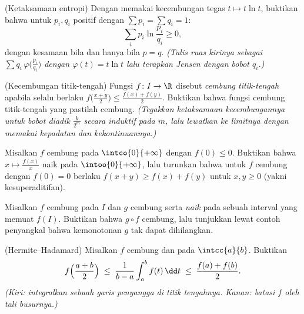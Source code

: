\begin{exercise}[$\star\star$]\label{exo:b2:realfun:7}
(Ketaksamaan entropi) Dengan memakai kecembungan tegas $t \mapsto t\ln
t$, buktikan bahwa untuk $p_i, q_i$ positif dengan $\sum p_i = \sum q_i = 1$:
\[
\sum_i p_i \ln\frac{p_i}{q_i} \geq 0 ,
\]
dengan kesamaan bila dan hanya bila $p = q$. \emph{(Tulis ruas kirinya
sebagai $\sum q_i\, \varphi\bigl(\frac{p_i}{q_i}\bigr)$ dengan
$\varphi(t) = t\ln t$ lalu terapkan Jensen dengan bobot $q_i$.)}
\end{exercise}

\begin{exercise}[$\star\star\star$]\label{exo:b2:realfun:8}
(Kecembungan titik-tengah) Fungsi $f \colon I \to \R$ disebut
\emph{cembung titik-tengah} apabila selalu berlaku
$f\bigl(\frac{x+y}{2}\bigr) \leq \frac{f(x) + f(y)}{2}$. Buktikan bahwa
fungsi cembung titik-tengah yang \emph{} pastilah cembung.
\emph{(Tegakkan ketaksamaan kecembungannya untuk bobot diadik
$\frac{k}{2^m}$ secara induktif pada $m$, lalu lewatkan ke limitnya
dengan memakai kepadatan dan kekontinuannya.)}
\end{exercise}

\begin{exercise}[$\star\star\star$]\label{exo:b2:realfun:9}
Misalkan $f$ cembung pada $\intco{0}{+\infty}$ dengan $f(0) \leq 0$.
Buktikan bahwa $x \mapsto \frac{f(x)}{x}$ naik pada
$\intoo{0}{+\infty}$, lalu turunkan bahwa untuk $f$ cembung dengan $f(0)
= 0$ berlaku $f(x + y) \geq f(x) + f(y)$ untuk $x, y \geq 0$
(yakni kesuperaditifan).
\end{exercise}

\begin{exercise}[$\star$]\label{exo:b2:realfun:10}
Misalkan $f$ cembung pada $I$ dan $g$ cembung serta \emph{naik} pada
sebuah interval yang memuat $f(I)$. Buktikan bahwa $g \circ f$ cembung,
lalu tunjukkan lewat contoh penyangkal bahwa kemonotonan $g$ tak dapat
dihilangkan.
\end{exercise}

\begin{exercise}[$\star\star$]\label{exo:b2:realfun:11}
(Hermite--Hadamard) Misalkan $f$ cembung dan  pada
$\intcc{a}{b}$. Buktikan
\[
f\Bigl(\frac{a+b}{2}\Bigr) \;\leq\; \frac{1}{b -
a}\int_a^b f(t)\,\dd t \;\leq\; \frac{f(a) + f(b)}{2} .
\]
\emph{(Kiri: integralkan sebuah garis penyangga di titik tengahnya.
Kanan: batasi $f$ oleh tali busurnya.)}
\end{exercise}

